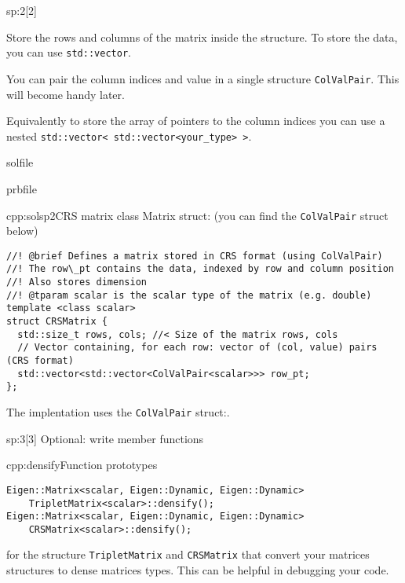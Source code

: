 \begin{samproblem}
\begin{subproblem}{sp:2}[2]
  \begin{samhint}
   Store the rows and columns of the matrix inside the structure. To store the data, you can use \verb|std::vector|.
  \end{samhint}
  
  \begin{samhint}
   You can pair the column indices and value in a single structure \verb|ColValPair|. This will become handy later.
  \end{samhint}
  
  \begin{samhint}
   Equivalently to store the array of pointers to the column indices you can use a nested \verb|std::vector< std::vector<your_type> >|.
  \end{samhint}

  \begin{samwriteprbpart}{solfile}
    \begin{writeverbatim}{prbfile}
      \begin{samsolution}
			\begin{samcode}[C++-code]{cpp:solsp2}{CRS matrix class}
				Matrix struct: (you can find the \texttt{ColValPair} struct below)
				\begin{lstlisting}[style=cpp]
//! @brief Defines a matrix stored in CRS format (using ColValPair)
//! The row\_pt contains the data, indexed by row and column position
//! Also stores dimension
//! @tparam scalar is the scalar type of the matrix (e.g. double)
template <class scalar>
struct CRSMatrix {
  std::size_t rows, cols; //< Size of the matrix rows, cols
  // Vector containing, for each row: vector of (col, value) pairs (CRS format)
  std::vector<std::vector<ColValPair<scalar>>> row_pt;
};
				\end{lstlisting}
			The implentation uses the \texttt{ColValPair} struct:.
			\end{samcode}
      \end{samsolution}
    \end{writeverbatim}
  \end{samwriteprbpart}


\end{subproblem}
 
\begin{subproblem}{sp:3}[3]
  Optional: write member functions
	\begin{samcode}[C++-code]{cpp:densify}{Function prototypes}
		\begin{lstlisting}[style=cpp]
Eigen::Matrix<scalar, Eigen::Dynamic, Eigen::Dynamic>
    TripletMatrix<scalar>::densify();
Eigen::Matrix<scalar, Eigen::Dynamic, Eigen::Dynamic>
    CRSMatrix<scalar>::densify();
		\end{lstlisting}
	\end{samcode}
  for the structure \verb|TripletMatrix| and \verb|CRSMatrix| that convert your matrices structures to \eigen{} dense matrices types. This can be helpful in debugging your code.


\end{subproblem}
\end{samproblem}
